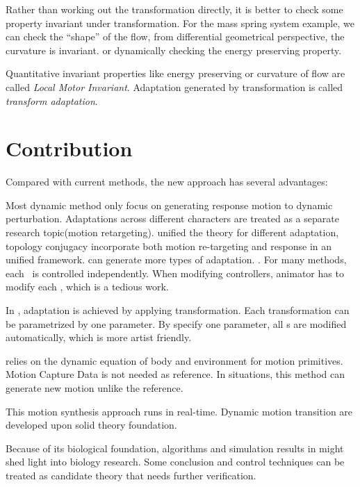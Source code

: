 Rather than working out the transformation directly,
it is better to check some property invariant under transformation.
For the mass spring system example, we can check the ``shape'' of the flow,
from differential geometrical perspective,  the curvature is invariant.
or dynamically checking the energy preserving property. 
 


Quantitative invariant properties like energy preserving or curvature of flow are called \emph{Local Motor Invariant}. 
Adaptation generated by transformation is called \emph{transform adaptation}.

\section{Contribution}

Compared with current \cms methods, the new approach has several advantages:
\begin{enumerate}
Most dynamic method only focus on generating response motion to dynamic perturbation.
Adaptations across different characters are treated as a separate  research topic(motion retargeting).
\moit unified the theory for different adaptation, topology conjugacy  incorporate both motion re-targeting and  response  in an unified framework.
\moit can generate more types of adaptation.
.
For many \cms methods, each \dof ~is controlled independently.
When modifying controllers, animator has to modify each \dof, which is a tedious work.

In \moit, adaptation is achieved by applying transformation.
Each transformation can be parametrized by one parameter.
By specify one parameter, all \dof s are modified automatically, which is more artist friendly.

\moit relies on the dynamic equation of body and environment for motion primitives.
Motion Capture Data is not needed as reference.
In situations, this method can generate new motion unlike the reference.


This motion synthesis approach runs in real-time.
Dynamic motion transition are developed upon solid theory foundation.

\end{enumerate}

Because of its biological foundation,
algorithms and simulation results in \moit  might shed light into biology research.
Some conclusion and control techniques can be treated as candidate theory that needs further verification.

